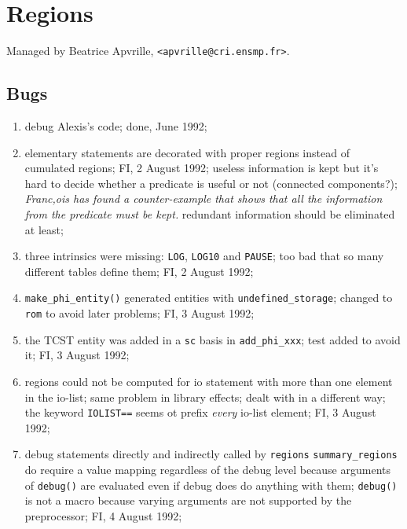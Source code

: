 \newpage

\section{Regions}

Managed by Beatrice Apvrille, \verb+<apvrille@cri.ensmp.fr>+.

\subsection{Bugs}

\begin{enumerate}

  \item debug Alexis's code; done, June 1992;

  \item elementary statements are decorated with proper regions
	instead of cumulated regions; FI, 2 August 1992;
	useless information is kept but it's hard to decide whether
	a predicate is useful or not (connected components?); {\em
	Franc,ois has found a counter-example that shows that all the 
	information from the predicate must be kept.\/}
	redundant information should be eliminated at least;

  \item three intrinsics were missing: \verb+LOG+, \verb+LOG10+ and
	\verb+PAUSE+; too bad that so many different tables define
	them; FI, 2 August 1992;

  \item \verb+make_phi_entity()+ generated entities with 
	\verb+undefined_storage+; changed to \verb+rom+ to avoid
	later problems; FI, 3 August 1992;

  \item the TCST entity was added in a \verb+sc+ basis in \verb+add_phi_xxx+;
	test added to avoid it; FI, 3 August 1992;

  \item regions could not be computed for io statement with more than
	one element in the io-list; same problem in library effects;
	dealt with in a different way; the keyword \verb+IOLIST==+
	seems ot prefix {\em every} io-list element; FI, 3 August 1992;

  \item debug statements directly and indirectly called by \verb+regions+
	\verb+summary_regions+ do require a value mapping regardless of
	the debug level because arguments of \verb+debug()+ are evaluated
	even if debug does do anything with them; \verb+debug()+ is not
	a macro because varying arguments are not supported by the
	preprocessor; FI, 4 August 1992;


\end{enumerate}
